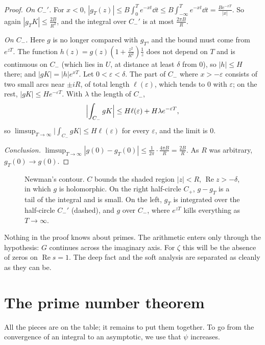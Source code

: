 \begin{proof}
\emph{On $C_-'$.} For $x<0$, $|g_T(z)|\le B\int_0^Te^{-xt}\dd t\le B\int_{-\infty}^Te^{-xt}\dd t=\frac{Be^{-xT}}{|x|}$. So again $|g_TK|\le\frac{2B}{R^2}$, and the integral over $C_-'$ is at most $\frac{2\pi B}R$.

\emph{On $C_-$.} Here $g$ is no longer compared with $g_T$, and the bound must come from $e^{zT}$. The function $h(z)=g(z)(1+\frac{z^2}{R^2})\frac1z$ does not depend on $T$ and is
continuous on $C_-$ (which lies in $U$, at distance at least $\delta$ from $0$), so $|h|\le H$ there; and $|gK|=|h|e^{xT}$. Let $0<\varepsilon<\delta$. The part of $C_-$ where
$x>-\varepsilon$ consists of two small arcs near $\pm iR$, of total length $\ell(\varepsilon)$, which tends to $0$ with $\varepsilon$; on the rest, $|gK|\le He^{-\varepsilon T}$. With $\lambda$ the length
of $C_-$,
\[
\Bigl|\int_{C_-}gK\Bigr|\le H\ell(\varepsilon)+H\lambda e^{-\varepsilon T},
\]
so $\limsup_{T\to\infty}\bigl|\int_{C_-}gK\bigr|\le H\ell(\varepsilon)$ for every $\varepsilon$, and the limit is $0$.

\emph{Conclusion.} $\limsup_{T\to\infty}|g(0)-g_T(0)|\le\frac1{2\pi}\cdot\frac{4\pi B}R=\frac{2B}R$. As $R$ was arbitrary, $g_T(0)\to g(0)$.
\end{proof}

\begin{figure}[ht]
\centering
{}
\caption{Newman's contour. $C$ bounds the shaded region $|z|<R$, $\operatorname{Re}z>-\delta$, in which $g$ is holomorphic. On the right half-circle $C_+$, $g-g_T$ is a tail of the
integral and is small. On the left, $g_T$ is integrated over the half-circle $C_-'$ (dashed), and $g$ over $C_-$, where $e^{zT}$ kills everything as $T\to\infty$.}
\label{fig:contour}
\end{figure}

\begin{beauty}
Nothing in the proof knows about primes. The arithmetic enters only through the hypothesis: $G$ continues across the imaginary axis. For $\zeta$ this will be the absence of zeros
on $\operatorname{Re}s=1$. The deep fact and the soft analysis are separated as cleanly as they can be.
\end{beauty}

\section{The prime number theorem}

All the pieces are on the table; it remains to put them together. To go from the convergence of an integral to an asymptotic, we use that $\psi$ increases.

